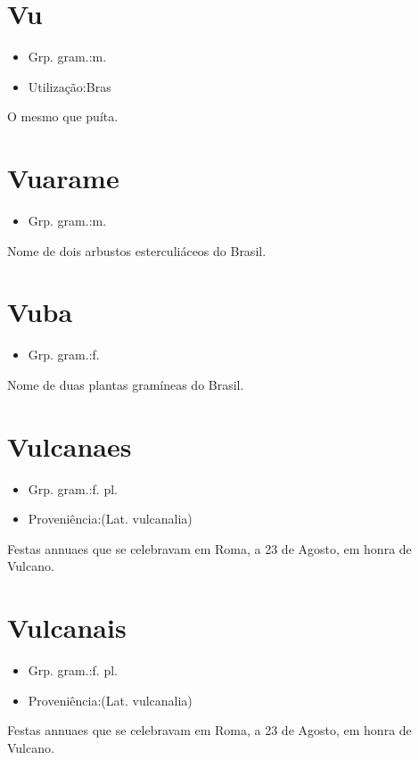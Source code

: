 \documentclass{article}
\begin{document}
\section{Vu}
\begin{itemize}
\item {Grp. gram.:m.}
\end{itemize}
\begin{itemize}
\item {Utilização:Bras}
\end{itemize}
O mesmo que \textunderscore puíta\textunderscore .
\section{Vuarame}
\begin{itemize}
\item {Grp. gram.:m.}
\end{itemize}
Nome de dois arbustos esterculiáceos do Brasil.
\section{Vuba}
\begin{itemize}
\item {Grp. gram.:f.}
\end{itemize}
Nome de duas plantas gramíneas do Brasil.
\section{Vulcanaes}
\begin{itemize}
\item {Grp. gram.:f. pl.}
\end{itemize}
\begin{itemize}
\item {Proveniência:(Lat. \textunderscore vulcanalia\textunderscore )}
\end{itemize}
Festas annuaes que se celebravam em Roma, a 23 de Agosto, em honra de Vulcano.
\section{Vulcanais}
\begin{itemize}
\item {Grp. gram.:f. pl.}
\end{itemize}
\begin{itemize}
\item {Proveniência:(Lat. \textunderscore vulcanalia\textunderscore )}
\end{itemize}
Festas annuaes que se celebravam em Roma, a 23 de Agosto, em honra de Vulcano.
\end{document}
